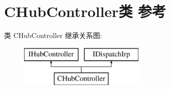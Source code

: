 \hypertarget{class_c_hub_controller}{}\section{C\+Hub\+Controller类 参考}
\label{class_c_hub_controller}
类 C\+Hub\+Controller 继承关系图\+:\begin{figure}[H]
\begin{center}
\leavevmode
\includegraphics[height=2.000000cm]{class_c_hub_controller}
\end{center}
\end{figure}
